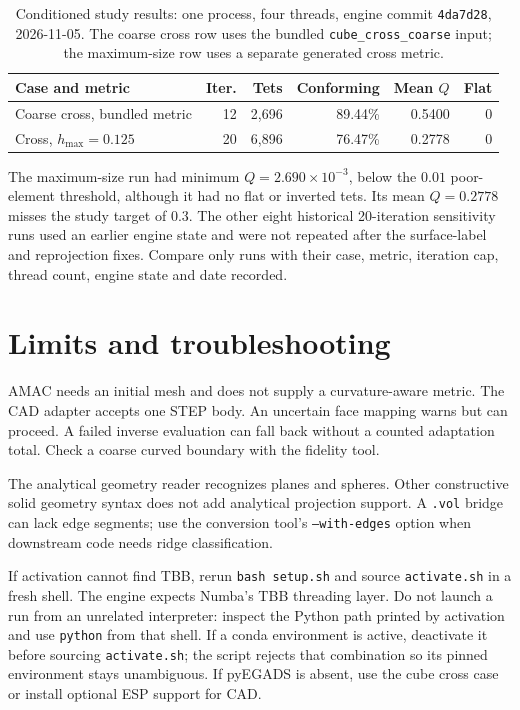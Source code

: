 \documentclass[11pt,a4paper]{article}
\begin{document}
\begin{table}[H]
\centering\small
\begin{tabular}{p{.25\linewidth}rrrrr}
\toprule
Case and metric & Iter. & Tets & Conforming & Mean $Q$ & Flat\\
\midrule
Coarse cross, bundled metric & 12 & 2,696 & 89.44\% & 0.5400 & 0\\
Cross, $h_{\max}=0.125$ & 20 & 6,896 & 76.47\% & 0.2778 & 0\\
\bottomrule
\end{tabular}
\caption{Conditioned study results: one process, four threads, engine commit \texttt{4da7d28}, 2026-11-05. The coarse cross row uses the bundled \texttt{cube\_cross\_coarse} input; the maximum-size row uses a separate generated cross metric.}
\label{tab:results}
\end{table}

The maximum-size run had minimum $Q=2.690\times10^{-3}$, below the $0.01$ poor-element threshold, although it had no flat or inverted tets. Its mean $Q=0.2778$ misses the study target of $0.3$. The other eight historical 20-iteration sensitivity runs used an earlier engine state and were not repeated after the surface-label and reprojection fixes. Compare only runs with their case, metric, iteration cap, thread count, engine state and date recorded.

\section{Limits and troubleshooting}
AMAC needs an initial mesh and does not supply a curvature-aware metric. The CAD adapter accepts one STEP body. An uncertain face mapping warns but can proceed. A failed inverse evaluation can fall back without a counted adaptation total. Check a coarse curved boundary with the fidelity tool.

The analytical geometry reader recognizes planes and spheres. Other constructive solid geometry syntax does not add analytical projection support. A \texttt{.vol} bridge can lack edge segments; use the conversion tool's \texttt{--with-edges} option when downstream code needs ridge classification.

If activation cannot find TBB, rerun \texttt{bash setup.sh} and source \texttt{activate.sh} in a fresh shell. The engine expects Numba's TBB threading layer. Do not launch a run from an unrelated interpreter: inspect the Python path printed by activation and use \texttt{python} from that shell. If a conda environment is active, deactivate it before sourcing \texttt{activate.sh}; the script rejects that combination so its pinned environment stays unambiguous. If pyEGADS is absent, use the cube cross case or install optional ESP support for CAD.
\end{document}
